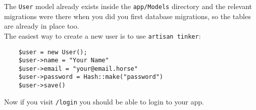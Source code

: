 The \texttt{User} model already exists inside the \texttt{app/Models} directory and the relevant migrations were there when you did you first database migrations, so the tables are already in place too.
\\

The easiest way to create a new user is to use \texttt{artisan tinker}:

\begin{verbatim}
    $user = new User();
    $user->name = "Your Name"
    $user->email = "your@email.horse"
    $user->password = Hash::make("password")
    $user->save()
\end{verbatim}

Now if you visit \texttt{/login} you should be able to login to your app.

\pagebreak


